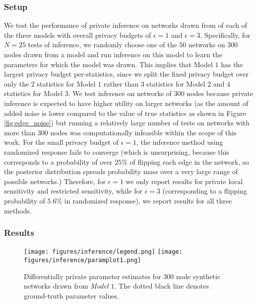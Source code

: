  \subsubsection{Setup}
 
 We test the performance of private inference on networks drawn from of each of the three models with overall privacy budgets of $\epsilon=1$ and $\epsilon=3$. Specifically, for $N=25$ tests of inference, we randomly choose one of the $50$ networks on $300$ nodes drawn from a model and run inference on this model to learn the parameters for which the model was drawn. This implies that Model $1$ has the largest privacy budget per-statistics, since we split the fixed privacy budget over only the $2$ statistics for Model $1$ rather than $3$ statistics for Model $2$ and $4$ statistics for Model $3$. We test inference on networks of $300$ nodes because private inference is expected to have higher utility on larger networks (as the amount of added noise is lower compared to the value of true statistics as shown in Figure \ref{fig:edge_noise}) but running a relatively large number of tests on networks with more than $300$ nodes was computationally infeasible within the scope of this work. For the small privacy budget of $\epsilon=1$, the inference method using randomized response fails to converge (which is unsurprising, because this corresponds to a probability of over $25\%$ of flipping each edge in the network, so the posterior distribution spreads probability mass over a very large range of possible networks.) Therefore, for $\epsilon=1$ we only report results for private local sensitivity and restricted sensitivity, while for $\epsilon = 3$ (corresponding to a flipping probability of $5.6\%$ in randomized response), we report results for all three methods.
 
 \subsubsection{Results}
  
 
  \begin{figure}[h]
 \caption{Differentially private parameter estimates for $300$ node synthetic networks drawn from \emph{Model $\mathit{1}$}. The dotted black line denotes ground-truth parameter values.}
 \centering 
 \texttt{[image: figures/inference/legend.png]}
 \texttt{[image: figures/inference/paramplot1.png]}
 \label{fig:edgeinfsynth1}
\end{figure}

